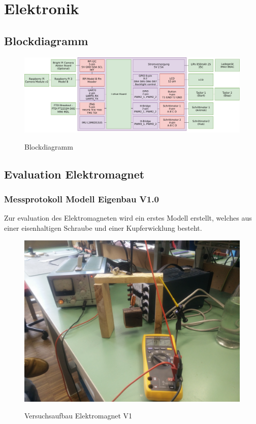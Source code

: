 \documentclass[a4paper]{report}
\begin{document}
\section{Elektronik}
\subsection{Blockdiagramm}
\begin{figure}[h!]
  \includegraphics[keepaspectratio,width=\textwidth]{BlockdiagrammElektronik}
  \label{fig:ElektronikBlockdiagramm}
  \caption{Blockdiagramm}
\end{figure}
\newpage
\subsection{Evaluation Elektromagnet}
\subsubsection{Messprotokoll Modell Eigenbau V1.0}
Zur evaluation des Elektromagneten wird ein erstes Modell erstellt, welches aus einer eisenhaltigen Schraube und einer Kupferwicklung besteht.
\begin{figure}[h!]
	\includegraphics[keepaspectratio,width=\textwidth]{Versuchsaufbau_Elektromagnet_v1}
	\label{fig:VersuchsaufbauElektromagnet}
	\caption{Versuchsaufbau Elektromagnet V1}
\end{figure}
\end{document}

